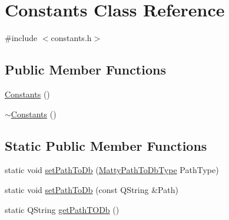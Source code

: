 \hypertarget{classConstants}{}\section{Constants Class Reference}
\label{classConstants}


{\ttfamily \#include $<$constants.\+h$>$}

\subsection*{Public Member Functions}
\begin{DoxyCompactItemize}
\item 
\hyperlink{classConstants_af395b3c1d6f0577f4880a21a257aa1db}{Constants} ()
\item 
\hyperlink{classConstants_a2dce6c6db3f1ba4114550606fae1765a}{$\sim$\+Constants} ()
\end{DoxyCompactItemize}
\subsection*{Static Public Member Functions}
\begin{DoxyCompactItemize}
\item 
static void \hyperlink{classConstants_a3d474cb2c4e964cb64ab6f2db6e1bf92}{set\+Path\+To\+Db} (\hyperlink{constants_8h_a9558e0854b1cdaf803f7a80df80ab91b}{Matty\+Path\+To\+Db\+Type} Path\+Type)
\item 
static void \hyperlink{classConstants_ac46a51b8ad96c36ebca1ffef26b11f84}{set\+Path\+To\+Db} (const Q\+String \&Path)
\item 
static Q\+String \hyperlink{classConstants_ac74d671466a62e47fa4e431dbc569ba1}{get\+Path\+T\+O\+Db} ()
\end{DoxyCompactItemize}
